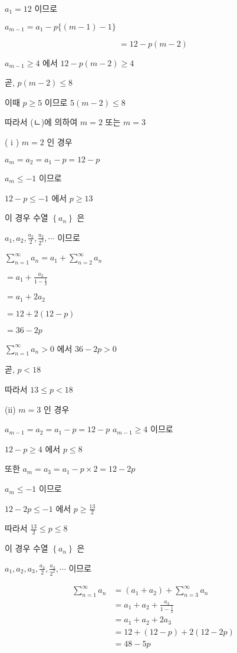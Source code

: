 \documentclass[10pt]{article}
\begin{document}
$a_{1}=12$ 이므로

$a_{m-1}=a_{1}-p\{(m-1)-1\}$

\[
=12-p(m-2)
\]

$a_{m-1} \geq 4$ 에서 $12-p(m-2) \geq 4$

곧, $p(m-2) \leq 8$

이때 $p \geq 5$ 이므로 $5(m-2) \leq 8$

따라서 (ㄴ)에 의하여 $m=2$ 또는 $m=3$

( i ) $m=2$ 인 경우

$a_{m}=a_{2}=a_{1}-p=12-p$

$a_{m} \leq-1$ 이므로

$12-p \leq-1$ 에서 $p \geq 13$

이 경우 수열 $\left\{a_{n}\right\}$ 은

$a_{1}, a_{2}, \frac{a_{2}}{2}, \frac{a_{2}}{2^{2}}, \cdots$ 이므로

$\sum_{n=1}^{\infty} a_{n}=a_{1}+\sum_{n=2}^{\infty} a_{n}$

$=a_{1}+\frac{a_{2}}{1-\frac{1}{2}}$

$=a_{1}+2 a_{2}$

$=12+2(12-p)$

$=36-2 p$

$\sum_{n=1}^{\infty} a_{n}>0$ 에서 $36-2 p>0$

곧, $p<18$

따라서 $13 \leq p<18$

(ii) $m=3$ 인 경우

$a_{m-1}=a_{2}=a_{1}-p=12-p$ $a_{m-1} \geq 4$ 이므로

$12-p \geq 4$ 에서 $p \leq 8$

또한 $a_{m}=a_{3}=a_{1}-p \times 2=12-2 p$

$a_{m} \leq-1$ 이므로

$12-2 p \leq-1$ 에서 $p \geq \frac{13}{2}$

따라서 $\frac{13}{2} \leq p \leq 8$

이 경우 수열 $\left\{a_{n}\right\}$ 은

$a_{1}, a_{2}, a_{3}, \frac{a_{3}}{2}, \frac{a_{3}}{2^{2}}, \cdots$ 이므로

\[
\begin{aligned}
\sum_{n=1}^{\infty} a_{n} & =\left(a_{1}+a_{2}\right)+\sum_{n=3}^{\infty} a_{n} \\
& =a_{1}+a_{2}+\frac{a_{3}}{1-\frac{1}{2}} \\
& =a_{1}+a_{2}+2 a_{3} \\
& =12+(12-p)+2(12-2 p) \\
& =48-5 p
\end{aligned}
\]
\end{document}
